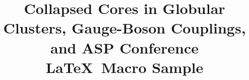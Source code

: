 \documentclass[11pt,twoside]{article}  %
\begin{document}

%


%

\title{Collapsed Cores in Globular Clusters, Gauge-Boson Couplings,
       and ASP Conference \LaTeX\ Macro Sample}
       
%
%
%
%
%


%
\end{document}
